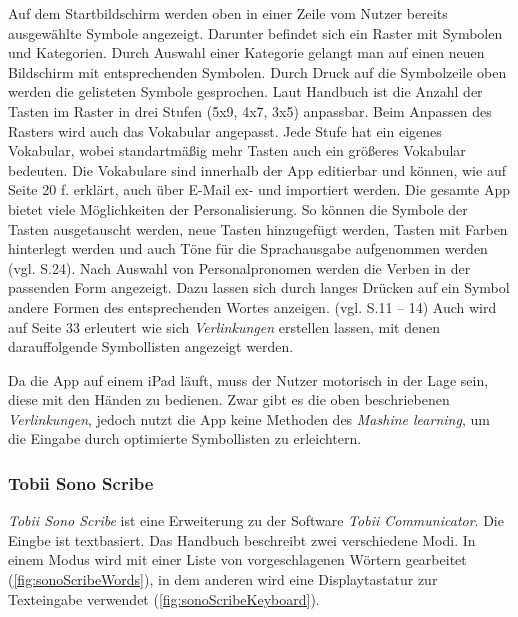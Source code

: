             Auf dem Startbildschirm werden oben in einer Zeile vom Nutzer bereits ausgewählte Symbole angezeigt. Darunter befindet sich ein Raster mit Symbolen und Kategorien. Durch Auswahl einer Kategorie gelangt man auf einen neuen Bildschirm mit entsprechenden Symbolen.
            Durch Druck auf die Symbolzeile oben werden die gelisteten Symbole gesprochen. 
            Laut Handbuch \parencite[S. 7 ff]{cidar:metaTalkManual} ist die Anzahl der Tasten im Raster in drei Stufen (5x9, 4x7, 3x5) anpassbar. Beim Anpassen des Rasters wird auch das Vokabular angepasst. Jede Stufe hat ein eigenes Vokabular, wobei standartmäßig mehr Tasten auch ein größeres Vokabular bedeuten. Die Vokabulare sind innerhalb der App editierbar und können, wie auf Seite 20 f. erklärt, auch über E-Mail ex- und importiert werden. Die gesamte App bietet viele Möglichkeiten der Personalisierung. So können die Symbole der Tasten ausgetauscht werden, neue Tasten hinzugefügt werden, Tasten mit Farben hinterlegt werden und auch Töne für die Sprachausgabe aufgenommen werden (vgl. S.24). Nach Auswahl von Personalpronomen werden die Verben in der passenden Form angezeigt. Dazu lassen sich durch langes Drücken auf ein Symbol andere Formen des entsprechenden Wortes anzeigen. (vgl. S.11 – 14) Auch wird auf Seite 33 erleutert wie sich \emph{Verlinkungen} erstellen lassen, mit denen darauffolgende Symbollisten angezeigt werden.
            
            Da die App auf einem iPad läuft, muss der Nutzer motorisch in der Lage sein, diese mit den Händen zu bedienen. Zwar gibt es die oben beschriebenen \emph{Verlinkungen}, jedoch nutzt die App keine Methoden des \emph{Mashine learning}, um die Eingabe durch optimierte Symbollisten zu erleichtern.
            
        \subsubsection*{Tobii Sono Scribe}
        
        	\emph{Tobii Sono Scribe} ist eine Erweiterung zu der Software \emph{Tobii Communicator}. Die Eingbe ist textbasiert. Das Handbuch \parencite[S. 8]{tobii:sonoScribeManual} beschreibt zwei verschiedene Modi. In einem Modus wird mit einer Liste von vorgeschlagenen Wörtern gearbeitet (\autoref{fig:sonoScribeWords}), in dem anderen wird eine Displaytastatur zur Texteingabe verwendet (\autoref{fig:sonoScribeKeyboard}).
            
